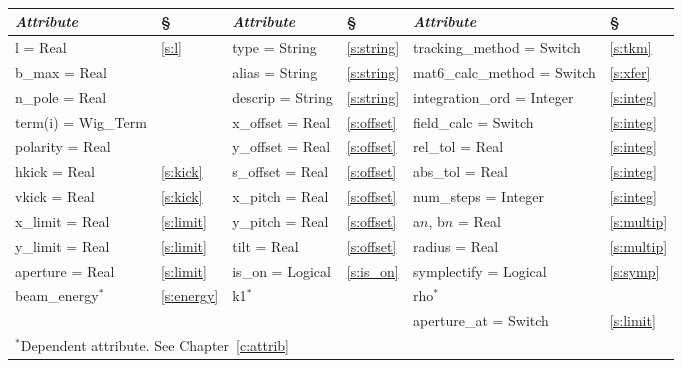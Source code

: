 {{\begin{center}
\tt
\begin{tabular}{|l|l||l|l||l|l|} \hline
  {\sl Attribute} & \S  & {\sl Attribute} & \S & {\sl Attribute} & \S \\ \hline
  l        = Real       & \ref{s:l}      & type = String      & \ref{s:string} & tracking\_method = Switch   & \ref{s:tkm}   \\ \hline
  b\_max   = Real       &                & alias = String     & \ref{s:string} & mat6\_calc\_method = Switch & \ref{s:xfer}  \\ \hline
  n\_pole  = Real       &                & descrip = String   & \ref{s:string} & integration\_ord = Integer  & \ref{s:integ} \\ \hline
  term(i) = Wig\_Term   &                & x\_offset  = Real  & \ref{s:offset} & field\_calc = Switch        & \ref{s:integ} \\ \hline
  polarity = Real       &                & y\_offset  = Real  & \ref{s:offset} & rel\_tol = Real             & \ref{s:integ} \\ \hline
  hkick    = Real       & \ref{s:kick}   & s\_offset  = Real  & \ref{s:offset} & abs\_tol = Real             & \ref{s:integ} \\ \hline
  vkick    = Real       & \ref{s:kick}   & x\_pitch = Real    & \ref{s:offset} & num\_steps = Integer        & \ref{s:integ} \\ \hline
  x\_limit = Real       & \ref{s:limit}  & y\_pitch = Real    & \ref{s:offset} & a$n$, b$n$ = Real           & \ref{s:multip}\\ \hline
  y\_limit = Real       & \ref{s:limit}  & tilt     = Real    & \ref{s:offset} & radius  = Real              & \ref{s:multip}\\ \hline
  aperture = Real       & \ref{s:limit}  & is\_on = Logical   & \ref{s:is_on}  & symplectify = Logical       & \ref{s:symp}  \\ \hline
  beam\_energy$^*$      & \ref{s:energy} & k1$^*$             &                & rho$^*$                     &               \\ \hline
                        &                &                    &                & aperture\_at = Switch       & \ref{s:limit} \\ \hline
  \multicolumn{6}{l}{\small $^*$Dependent attribute. See Chapter~\ref{c:attrib}} \\
\end{tabular}
\end{center}
\toffset

}}
